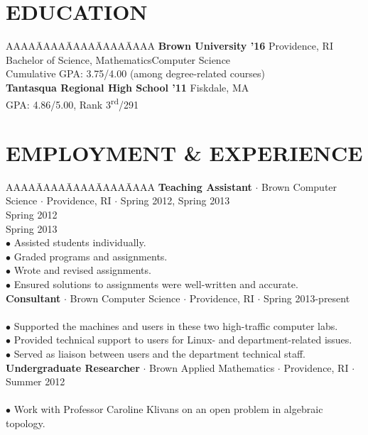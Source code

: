 \documentclass{res}
\begin{document}
\begin{resume}
\myvspace
\section{EDUCATION}     
\myvspace
\begin{tabbing}
AAAA\=AAAA\=AAAA\=AAAA\=AAAA\kill
{\bf Brown University '16} Providence, RI\\
	\>Bachelor of Science, Mathematics\textemdash Computer Science\\
	\>Cumulative GPA: 3.75/4.00 (among degree-related courses)\\
\sbreak
{\bf Tantasqua Regional High School '11} Fiskdale, MA\\
	\>GPA: 4.86/5.00, Rank 3\textsuperscript{rd}/291\\
\end{tabbing}
\sectionVspace %
\section{EMPLOYMENT \& EXPERIENCE}
   \myvspace
   \begin{tabbing}
   AAAA\=AAAA\=AAAA\=AAAA\=AAAA\kill
 {\bf Teaching Assistant} $\cdot$ Brown Computer Science $\cdot$ Providence, RI $\cdot$ Spring 2012, Spring 2013\\
	\>Spring 2012 \\
	\>Spring 2013 \\
	\>$\bullet$  Assisted students individually.\\
	\>$\bullet$  Graded programs and assignments.\\
	\>$\bullet$  Wrote and revised assignments.\\
	\>$\bullet$  Ensured solutions to assignments were well-written and accurate.\\
\sbreak
{\bf Consultant} $\cdot$ Brown Computer Science $\cdot$ Providence, RI $\cdot$ Spring 2013-present\\
	\\
	\>$\bullet$ Supported the machines and users in these two high-traffic computer labs.\\
	\>$\bullet$ Provided technical support to users for Linux- and department-related issues.\\
	\>$\bullet$ Served as  liaison between users and the department technical staff.\\
\sbreak
{\bf Undergraduate Researcher} $\cdot$ Brown Applied Mathematics $\cdot$ Providence, RI $\cdot$ Summer 2012\\
\\
\>$\bullet$ Work with Professor Caroline Klivans on an open problem in algebraic topology.\\


\end{tabbing}
\end{resume}
\end{document}
